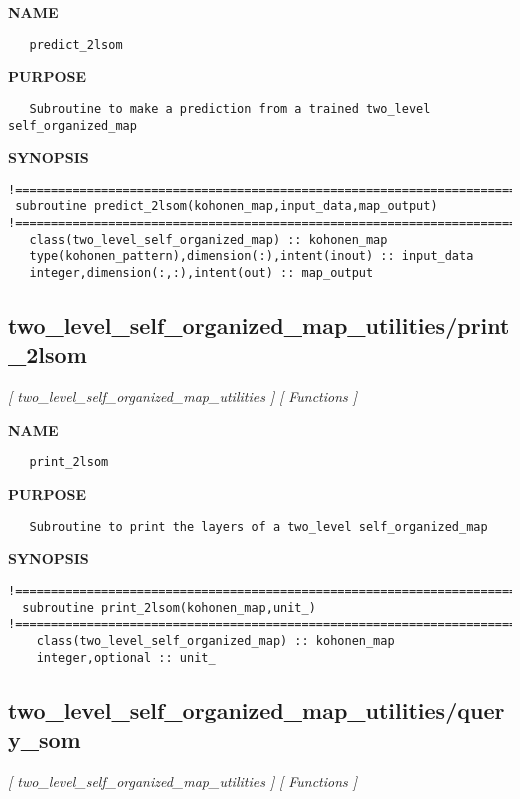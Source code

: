 \documentclass{article}
\begin{document}
\label{ch:robo72}
\label{ch:two_level_self_organized_map_utilities_predict_2lsom}
\textbf{NAME}
\begin{verbatim}
   predict_2lsom
\end{verbatim}
\textbf{PURPOSE}
\begin{verbatim}
   Subroutine to make a prediction from a trained two_level self_organized_map 
\end{verbatim}
\textbf{SYNOPSIS}
\begin{verbatim}
!========================================================================================
 subroutine predict_2lsom(kohonen_map,input_data,map_output)
!========================================================================================
   class(two_level_self_organized_map) :: kohonen_map
   type(kohonen_pattern),dimension(:),intent(inout) :: input_data
   integer,dimension(:,:),intent(out) :: map_output
\end{verbatim}
\newpage
\subsection{two\_level\_self\_organized\_map\_utilities/print\_2lsom}
\textsl{[ two\_level\_self\_organized\_map\_utilities ]}
\textsl{[ Functions ]}

\label{ch:robo73}
\label{ch:two_level_self_organized_map_utilities_print_2lsom}
\textbf{NAME}
\begin{verbatim}
   print_2lsom
\end{verbatim}
\textbf{PURPOSE}
\begin{verbatim}
   Subroutine to print the layers of a two_level self_organized_map 
\end{verbatim}
\textbf{SYNOPSIS}
\begin{verbatim}
!========================================================================================
  subroutine print_2lsom(kohonen_map,unit_)
!========================================================================================
    class(two_level_self_organized_map) :: kohonen_map
    integer,optional :: unit_
\end{verbatim}
\newpage
\subsection{two\_level\_self\_organized\_map\_utilities/query\_som}
\textsl{[ two\_level\_self\_organized\_map\_utilities ]}
\textsl{[ Functions ]}
\end{document}
